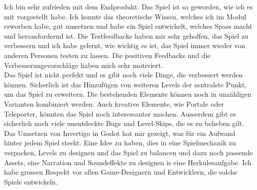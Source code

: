 \documentclass{article}
\begin{document}
Ich bin sehr zufrieden mit dem Endprodukt. Das Spiel ist so geworden, wie ich es mit vorgestellt habe. Ich konnte das theoretische Wissen, welches ich im Modul erworben habe, gut umsetzen und
habe ein Spiel entwickelt, welches Spass macht und herausfordernd ist. Die Testfeedbacks haben mir sehr geholfen, das Spiel zu verbessern und ich habe gelernt, wie wichtig es ist, das Spiel immer wieder
von anderen Personen testen zu lassen. Die positiven Feedbacks und die Verbesserungsvorschläge haben mich sehr motiviert.
\\
Das Spiel ist nicht perfekt und es gibt noch viele Dinge, die verbessert werden können. Sicherlich ist das Hinzufügen von weiteren Levels der zentralste Punkt, um das Spiel zu erweitern. Die bestehenden
Elemente können noch in unzähligen Varianten kombiniert werden. Auch kreative Elemente, wie Portale oder Teleporter, könnten das Spiel noch interessanter machen. Ausserdem gibt es sicherlich
noch viele unentdeckte Bugs und Level-Skips, die es zu beheben gilt.
\\
Das Umsetzen von Invertigo in Godot hat mir gezeigt, was für ein Aufwand hinter jedem Spiel steckt. Eine Idee zu haben, dies in eine Spielmechanik zu verpacken, Levels zu designen und das Spiel zu balancen
und dazu noch passende Assets, eine Narration und Soundeffekte zu designen is eine Herkulesaufgabe. Ich habe grossen Respekt vor allen Game-Designern und Entwicklern, die solche Spiele entwickeln.
\end{document}
